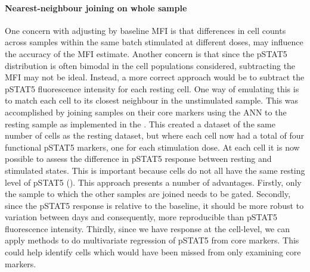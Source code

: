\paragraph{\label{paragraph:ANN} Nearest-neighbour joining on whole sample}
One concern with adjusting by baseline MFI is that differences in cell counts across samples within the same batch stimulated at different doses, may influence the accuracy of the MFI estimate.
Another concern is that since the pSTAT5 distribution is often bimodal in the cell populations considered, subtracting the MFI may not be ideal.
Instead, a more correct approach would be to subtract the pSTAT5 fluorescence intensity for each resting cell.
One way of emulating this is to match each cell to its closest neighbour in the unstimulated sample.  
This was accomplished by joining samples on their core markers using the \gls{ANN} to the resting sample \citep{Jones:2011ez}
as implemented in the .
This created a dataset of the same number of cells as the resting dataset, but where each cell now had a total of four functional pSTAT5 markers,
one for each stimulation dose.
At each cell it is now possible to assess the difference in pSTAT5 response between resting and stimulated states.
This is important because cells do not all have the same resting level of pSTAT5 ().
This approach presents a number of advantages.
Firstly, only the sample to which the other samples are joined needs to be gated.
Secondly, since the pSTAT5 response is relative to the baseline, it should be more robust to variation between days
and consequently, more reproducible than pSTAT5 fluorescence intensity.
Thirdly, since we have response at the cell-level, we can apply methods
to do multivariate regression of pSTAT5 from core markers.
This could help identify cells which would have been missed from only examining core markers.
